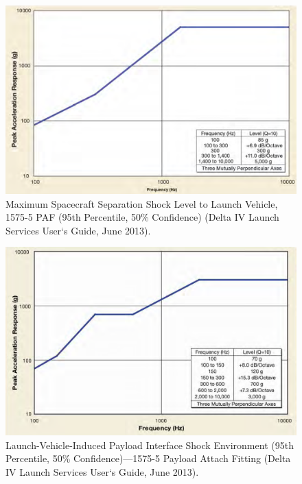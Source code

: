 \begin{figure}[h!]
\centering
\includegraphics[scale=0.3]{figures/Orbiter/fairing_sep_resp.png}
\caption{Maximum Spacecraft Separation Shock Level to Launch Vehicle, 1575-5 PAF (95th Percentile, 50\% Confidence) (Delta IV Launch Services User‘s Guide, June 2013).\cite{Atlasm}}
\end{figure}

\begin{figure}[h!]
\centering
\includegraphics[scale=0.3]{figures/Orbiter/before_fair_sep.png}
\caption{Launch-Vehicle-Induced Payload Interface Shock Environment (95th Percentile, 50\% Confidence)—1575-5 Payload Attach Fitting (Delta IV Launch Services User‘s Guide, June 2013).\cite{Atlasm}}
\end{figure}

